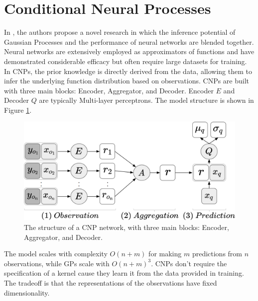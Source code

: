 \section{Conditional Neural Processes}
In \cite{DBLP:journals/corr/abs-1807-01613}, the authors propose a novel research in which the inference potential of Gaussian Processes and the performance of neural networks are blended together. Neural networks are extensively employed as approximators of functions and have demonstrated considerable efficacy but often require large datasets for training. In CNPs, the prior knowledge is directly derived from the data, allowing them to infer the underlying function distribution based on observations. CNPs are built with three main blocks: Encoder, Aggregator, and Decoder. Encoder $E$ and Decoder $Q$ are typically Multi-layer perceptrons. The model structure is shown in Figure \ref{fig:cnp}. 
\begin{figure}
	\centering
	\includegraphics[width=0.6\linewidth]{Images/CNP.png}
	\caption{The structure of a CNP network, with three main blocks: Encoder, Aggregator, and Decoder.}
	\label{fig:cnp}
\end{figure}
The model scales with complexity $O(n+m)$ for making $m$ predictions from $n$ observations, while GPs scale with $O(n+m)^3$. CNPs don't require the specification of a kernel cause they learn it from the data provided in training. The tradeoff is that the representations of the observations have fixed dimensionality.


